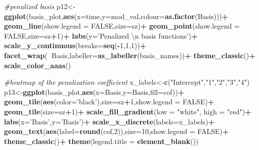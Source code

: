 \documentclass[
]{article}
\newenvironment{Shaded}{\begin{snugshade}}{\end{snugshade}}
\newcommand{\CharTok}[1]{\textcolor[rgb]{0.31,0.60,0.02}{#1}}
\newcommand{\CommentTok}[1]{\textcolor[rgb]{0.56,0.35,0.01}{\textit{#1}}}
\newcommand{\DataTypeTok}[1]{\textcolor[rgb]{0.13,0.29,0.53}{#1}}
\newcommand{\DecValTok}[1]{\textcolor[rgb]{0.00,0.00,0.81}{#1}}
\newcommand{\KeywordTok}[1]{\textcolor[rgb]{0.13,0.29,0.53}{\textbf{#1}}}
\newcommand{\NormalTok}[1]{#1}
\newcommand{\OperatorTok}[1]{\textcolor[rgb]{0.81,0.36,0.00}{\textbf{#1}}}
\newcommand{\OtherTok}[1]{\textcolor[rgb]{0.56,0.35,0.01}{#1}}
\newcommand{\StringTok}[1]{\textcolor[rgb]{0.31,0.60,0.02}{#1}}
\begin{document}
\begin{Shaded}
\begin{Highlighting}[]
{{{{{{\CommentTok{#penalized basis}
\NormalTok{p12<-}\KeywordTok{ggplot}\NormalTok{(basis_plot,}\KeywordTok{aes}\NormalTok{(}\DataTypeTok{x=}\NormalTok{time,}\DataTypeTok{y=}\NormalTok{mod_val,}\DataTypeTok{colour=}\KeywordTok{as.factor}\NormalTok{(Basis)))}\OperatorTok{+}
\StringTok{  }\KeywordTok{geom_line}\NormalTok{(}\DataTypeTok{show.legend =} \OtherTok{FALSE}\NormalTok{,}\DataTypeTok{size=}\NormalTok{sz)}\OperatorTok{+}
\StringTok{  }\KeywordTok{geom_point}\NormalTok{(}\DataTypeTok{show.legend =} \OtherTok{FALSE}\NormalTok{,}\DataTypeTok{size=}\NormalTok{sz}\OperatorTok{+}\DecValTok{1}\NormalTok{)}\OperatorTok{+}
\StringTok{  }\KeywordTok{labs}\NormalTok{(}\DataTypeTok{y=}\StringTok{'Penalized }\CharTok{\textbackslash{}n}\StringTok{ basis functions'}\NormalTok{)}\OperatorTok{+}
\StringTok{  }\KeywordTok{scale_y_continuous}\NormalTok{(}\DataTypeTok{breaks=}\KeywordTok{seq}\NormalTok{(}\OperatorTok{-}\DecValTok{1}\NormalTok{,}\DecValTok{1}\NormalTok{,}\DecValTok{1}\NormalTok{))}\OperatorTok{+}
\StringTok{  }\KeywordTok{facet_wrap}\NormalTok{(}\OperatorTok{~}\NormalTok{Basis,}\DataTypeTok{labeller=}\KeywordTok{as_labeller}\NormalTok{(basis_names))}\OperatorTok{+}
\StringTok{  }\KeywordTok{theme_classic}\NormalTok{()}\OperatorTok{+}
\StringTok{  }\KeywordTok{scale_color_aaas}\NormalTok{()}

\CommentTok{#heatmap of the penalization coefficient}
\NormalTok{x_labels<-}\KeywordTok{c}\NormalTok{(}\StringTok{"Intercept"}\NormalTok{,}\StringTok{"1"}\NormalTok{,}\StringTok{"2"}\NormalTok{,}\StringTok{"3"}\NormalTok{,}\StringTok{"4"}\NormalTok{)}
\NormalTok{p13<-}\KeywordTok{ggplot}\NormalTok{(basis_plot,}\KeywordTok{aes}\NormalTok{(}\DataTypeTok{x=}\NormalTok{Basis,}\DataTypeTok{y=}\NormalTok{Basis,}\DataTypeTok{fill=}\NormalTok{cof))}\OperatorTok{+}
\StringTok{  }\KeywordTok{geom_tile}\NormalTok{(}\KeywordTok{aes}\NormalTok{(}\DataTypeTok{color=}\StringTok{'black'}\NormalTok{),}\DataTypeTok{size=}\NormalTok{sz}\OperatorTok{+}\DecValTok{1}\NormalTok{,}\DataTypeTok{show.legend =} \OtherTok{FALSE}\NormalTok{)}\OperatorTok{+}
\StringTok{  }\KeywordTok{geom_tile}\NormalTok{(}\DataTypeTok{size=}\NormalTok{sz}\OperatorTok{+}\DecValTok{1}\NormalTok{)}\OperatorTok{+}
\StringTok{  }\KeywordTok{scale_fill_gradient}\NormalTok{(}\DataTypeTok{low =} \StringTok{"white"}\NormalTok{, }\DataTypeTok{high =} \StringTok{"red"}\NormalTok{)}\OperatorTok{+}
\StringTok{  }\KeywordTok{labs}\NormalTok{(}\DataTypeTok{x=}\StringTok{'Basis'}\NormalTok{,}\DataTypeTok{y=}\StringTok{'Basis'}\NormalTok{)}\OperatorTok{+}
\StringTok{  }\KeywordTok{scale_x_discrete}\NormalTok{(}\DataTypeTok{labels=}\NormalTok{x_labels)}\OperatorTok{+}
\StringTok{  }\KeywordTok{geom_text}\NormalTok{(}\KeywordTok{aes}\NormalTok{(}\DataTypeTok{label=}\KeywordTok{round}\NormalTok{(cof,}\DecValTok{2}\NormalTok{)),}\DataTypeTok{size=}\DecValTok{10}\NormalTok{,}\DataTypeTok{show.legend =} \OtherTok{FALSE}\NormalTok{)}\OperatorTok{+}
\StringTok{  }\KeywordTok{theme_classic}\NormalTok{()}\OperatorTok{+}
\StringTok{  }\KeywordTok{theme}\NormalTok{(}\DataTypeTok{legend.title =} \KeywordTok{element_blank}\NormalTok{())}
  
}}}}}}
\end{Highlighting}
\end{Shaded}
\end{document}
